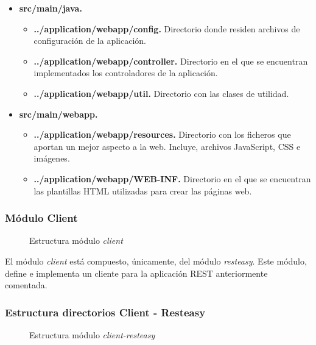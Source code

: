 \begin{itemize}
	\item \textbf{src/main/java. }
	\begin{itemize}
		\item \textbf{../application/webapp/config. }Directorio donde residen archivos de configuración de la aplicación.
		\item \textbf{../application/webapp/controller. }Directorio en el que se encuentran implementados los controladores de la aplicación.
		\item \textbf{../application/webapp/util. }Directorio con las clases de utilidad.
	\end{itemize}
	\item \textbf{src/main/webapp. }
	\begin{itemize}
		\item \textbf{../application/webapp/resources. }Directorio con los ficheros que aportan un mejor aspecto a la web. Incluye, archivos JavaScript, CSS e imágenes.
		\item \textbf{../application/webapp/WEB-INF. }Directorio en el que se encuentran las plantillas HTML utilizadas para crear las páginas web.
	\end{itemize}
\end{itemize}


\subsubsection*{Módulo Client}
\begin{figure}[H]
\centering
{}
\caption{Estructura módulo \textit{client}}
\end{figure}

El módulo \textit{client} está compuesto, únicamente, del módulo \textit{resteasy}. Este módulo, define e implementa un cliente para la aplicación REST anteriormente comentada.


\subsubsection*{Estructura directorios Client - Resteasy}
\begin{figure}[H]
\centering
{}
\caption{Estructura módulo \textit{client-resteasy}}
\end{figure}

